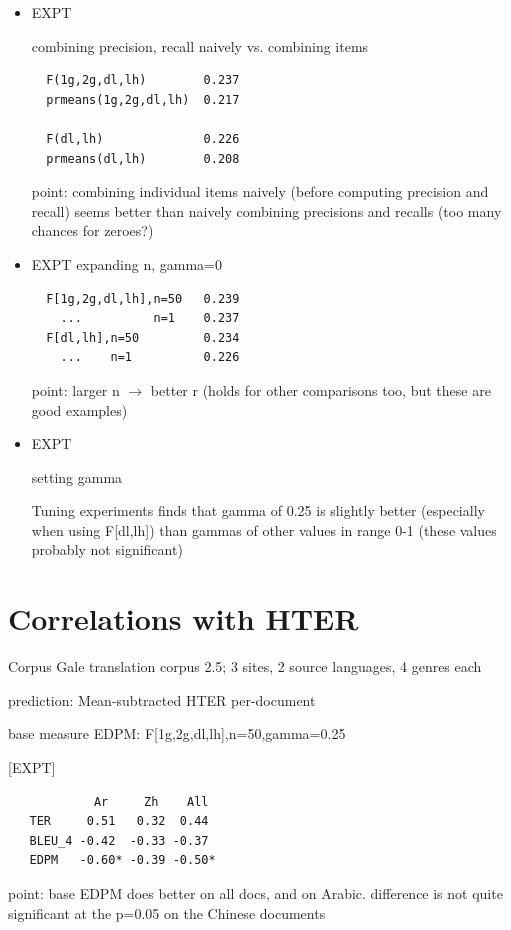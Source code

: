 \documentclass{kluwer}    %
\begin{document}
\begin{article}
\begin{itemize}
\item EXPT 

  combining precision, recall naively vs. combining items

\begin{verbatim}
  F(1g,2g,dl,lh)        0.237
  prmeans(1g,2g,dl,lh)  0.217

  F(dl,lh)              0.226
  prmeans(dl,lh)        0.208
\end{verbatim}

  point: combining individual items naively (before computing
  precision and recall) seems better than naively combining precisions
  and recalls (too many chances for zeroes?)

\item EXPT
  expanding n, gamma=0

\begin{verbatim}
  F[1g,2g,dl,lh],n=50   0.239
    ...          n=1    0.237
  F[dl,lh],n=50         0.234
    ...    n=1          0.226
\end{verbatim}
  point: larger n $\to$ better r
  (holds for other comparisons too, but these are good examples)

\item  EXPT

  setting gamma

  Tuning experiments finds that gamma of 0.25 is slightly better
  (especially when using F[dl,lh]) than gammas of other values in
  range 0-1 (these values probably not significant)

\end{itemize}

\section{Correlations with HTER}
\label{sec:hter1}
  Corpus
    Gale translation corpus 2.5; 3 sites, 2 source languages, 4 genres each

  prediction:
    Mean-subtracted HTER per-document

  base measure EDPM: F[1g,2g,dl,lh],n=50,gamma=0.25

  [EXPT]
\begin{verbatim}
            Ar     Zh    All
   TER     0.51   0.32  0.44
   BLEU_4 -0.42  -0.33 -0.37
   EDPM   -0.60* -0.39 -0.50*
\end{verbatim}
  point: base EDPM does better on all docs, and on Arabic. difference
  is not quite significant at the p=0.05 on the Chinese documents


\end{article}
\end{document}
